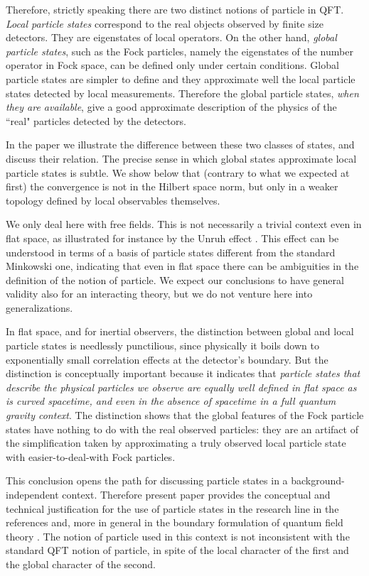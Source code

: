 \documentclass[10pt, nofootinbib]{revtex4}
\begin{document}
Therefore, strictly speaking there are two distinct notions of
particle in QFT. \emph{Local particle states} correspond to the real
objects observed by finite size detectors.  They are eigenstates of
local operators. On the other hand,  \emph{global particle states}, 
such as the Fock particles, namely the eigenstates of the number 
operator in Fock space, can be defined only under certain conditions.  
Global particle states are simpler to define and they approximate well 
the local particle states detected by local measurements.  Therefore 
the global particle states, {\em when they are available}, give a good
approximate description of the physics of the ``real" particles detected
by the detectors. 

In the paper we illustrate the difference between these two classes of
states, and discuss their relation.  The precise sense in which global
states approximate local particle states is subtle.  We show below
that (contrary to what we expected at first) the convergence is not in
the Hilbert space norm, but only in a weaker topology defined by local
observables themselves.

We only deal here with free fields.  This is not necessarily a trivial
context even in flat space, as illustrated for instance by the Unruh
effect \cite{Unruh:db}.  This effect can be understood in terms of a
basis of particle states different from the standard Minkowski one,
indicating that even in flat space there can be ambiguities in the
definition of the notion of particle.  We expect our conclusions to
have general validity also for an interacting theory, but we do not 
venture here into generalizations. 

In flat space, and for inertial observers, the distinction between
global and local particle states is needlessly punctilious, since
physically it boils down to exponentially small correlation effects at
the detector's boundary.  But the distinction is conceptually
important because it indicates that {\em particle states that
describe the physical particles we observe are equally well 
defined in flat space as is curved spacetime, and even in the 
absence of spacetime in a full quantum gravity context}.  
The distinction shows that the global features of the Fock particle 
states have nothing to do with the real observed particles: they 
are an artifact of the simplification taken by approximating a 
truly observed local particle state with easier-to-deal-with 
Fock particles.

This conclusion opens the path
for discussing particle states in a background-independent context.  
Therefore present paper provides the conceptual and technical 
justification for the use of particle states in the research line in the
references \cite{transitions} and, more in general in the boundary 
formulation of quantum field theory \cite{boundary,book}.  The notion of 
particle used in this context is  not 
inconsistent with the standard QFT notion of particle, in spite of 
the local character of the first and the global character of the second.   
\end{document}
